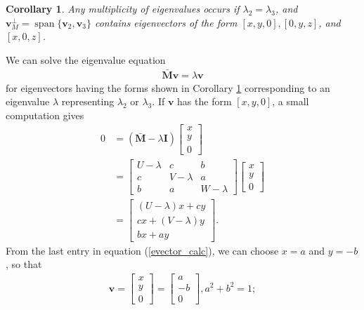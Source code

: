 \documentclass[preprint,12pt]{elsarticle}
\newcommand{\M}{\mathbf{M}}
\newcommand{\bv}{\mathbf{v}}
\newtheorem{corollary}[theorem]{Corollary}
\begin{document}
\begin{corollary}\label{second_eigenvector}
Any multiplicity of eigenvalues occurs if $\lambda_2=\lambda_3$, and $\bv_M^\perp=\operatorname{span}\{\bv_2, \bv_3\}$ contains eigenvectors of the form $[x,y,0], [0,y,z]$, and $[x,0,z]$.
\end{corollary}

We can solve the eigenvalue equation
\begin{align}\label{evalue_equation}
\bar{\M}\bv=\lambda \bv
\end{align}
for eigenvectors having the forms shown in Corollary \ref{second_eigenvector} corresponding to an eigenvalue $\lambda$ representing $\lambda_2$ or $\lambda_3$. If $\bv$ has the form $[x,y,0]$, a small computation gives
\begin{align}\label{evector_calc}
    0&  =(\bar{\M}-\lambda \mathbf{I})\begin{bmatrix}
           x \\
           y \\
           0
         \end{bmatrix}\nonumber\\
        &=  \begin{bmatrix}
            U-\lambda & c & b\\
            c & V-\lambda & a\\
            b & a & W-\lambda
            \end{bmatrix}
            \begin{bmatrix}
                x \\
                y \\
                0
            \end{bmatrix}\nonumber\\
        &=  \begin{bmatrix}
                (U-\lambda)x+cy\\
                cx +(V-\lambda)y\\
                bx+ay
            \end{bmatrix}.
\end{align}
From the last entry in equation (\ref{evector_calc}), we can choose $x=a$ and $y=-b$, so that 
\begin{align}\label{evector_solution}
\bv=\begin{bmatrix}
    x\\
    y\\
    0
\end{bmatrix} = \begin{bmatrix}
                    a\\
                    -b\\
                    0
                \end{bmatrix}, a^2+b^2=1;
\end{align}
\end{document}
